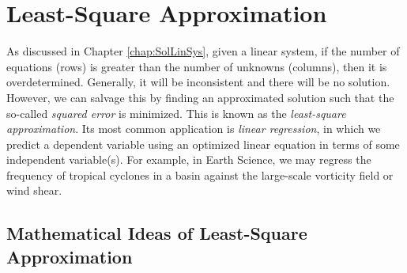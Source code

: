 \chapter{Least-Square Approximation}
\label{chap:leastsq}

As discussed in Chapter \ref{chap:SolLinSys}, given a linear system, if the number of equations (rows) is greater than the number of unknowns (columns), then it is overdetermined. Generally, it will be inconsistent and there will be no solution. However, we can salvage this by finding an approximated solution such that the so-called \textit{squared error} is minimized. This is known as the \textit{least-square approximation}. Its most common application is \textit{linear regression}, in which we predict a dependent variable using an optimized linear equation in terms of some independent variable(s). For example, in Earth Science, we may regress the frequency of tropical cyclones in a basin against the large-scale vorticity field or wind shear.

\section{Mathematical Ideas of Least-Square Approximation}

